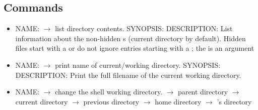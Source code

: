 \subsection{Commands}
\begin{itemize}
    \item NAME:  $ \rightarrow $ list directory contents.
    \subitem SYNOPSIS: 
    \subitem DESCRIPTION:
    List information about the non-hidden s (current directory by default).
    Hidden files start with a 
    \subitem {} or  do not ignore entries starting
    with a ; the  is an argument
    \item NAME:  $ \rightarrow $ print name of current/working directory.
    \subitem SYNOPSIS: 
    \subitem DESCRIPTION: Print the full filename of the current working directory.
    \item NAME:  $ \rightarrow $ change the shell working directory.
    \subitem {} $ \rightarrow $ parent directory
    \subitem {} $ \rightarrow $ current directory
    \subitem \code{-} $ \rightarrow $ previous directory
    \subitem \code{\textasciitilde} $ \rightarrow $ home directory
    \subitem {} $ \rightarrow $ 's directory
\end{itemize}